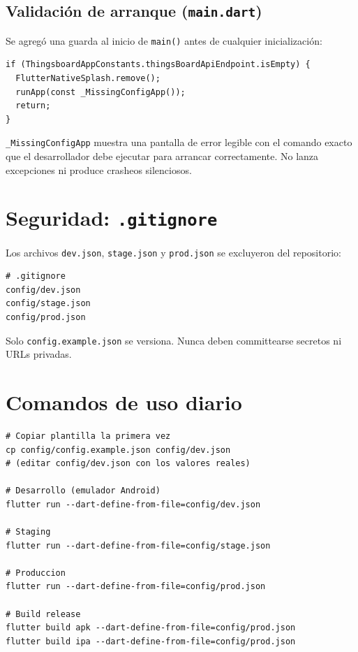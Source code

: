\documentclass[12pt, a4paper]{article}
\begin{document}
\subsection{Validación de arranque (\texttt{main.dart})}

Se agregó una guarda al inicio de \texttt{main()} antes de cualquier
inicialización:

\begin{lstlisting}[style=json, language={}, caption=lib/main.dart]
if (ThingsboardAppConstants.thingsBoardApiEndpoint.isEmpty) {
  FlutterNativeSplash.remove();
  runApp(const _MissingConfigApp());
  return;
}
\end{lstlisting}

\texttt{\_MissingConfigApp} muestra una pantalla de error legible con el
comando exacto que el desarrollador debe ejecutar para arrancar correctamente.
No lanza excepciones ni produce crasheos silenciosos.

\section{Seguridad: \texttt{.gitignore}}

Los archivos \texttt{dev.json}, \texttt{stage.json} y \texttt{prod.json} se
excluyeron del repositorio:

\begin{lstlisting}[style=bash]
# .gitignore
config/dev.json
config/stage.json
config/prod.json
\end{lstlisting}

Solo \texttt{config.example.json} se versiona. Nunca deben committearse
secretos ni URLs privadas.

\section{Comandos de uso diario}

\begin{lstlisting}[style=bash]
# Copiar plantilla la primera vez
cp config/config.example.json config/dev.json
# (editar config/dev.json con los valores reales)

# Desarrollo (emulador Android)
flutter run --dart-define-from-file=config/dev.json

# Staging
flutter run --dart-define-from-file=config/stage.json

# Produccion
flutter run --dart-define-from-file=config/prod.json

# Build release
flutter build apk --dart-define-from-file=config/prod.json
flutter build ipa --dart-define-from-file=config/prod.json
\end{lstlisting}
\end{document}
